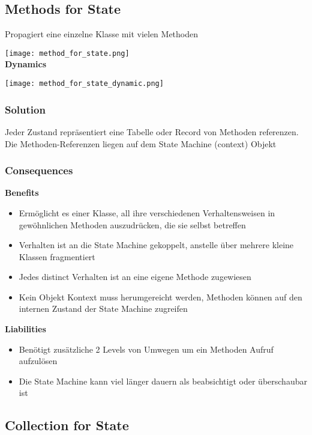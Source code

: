 \subsection{Methods for State}

Propagiert eine einzelne Klasse mit vielen Methoden

\texttt{[image: method\_for\_state.png]} \\

\textbf{Dynamics}

\texttt{[image: method\_for\_state\_dynamic.png]}

\subsubsection{Solution}

Jeder Zustand repräsentiert eine Tabelle oder Record von Methoden referenzen. Die Methoden-Referenzen liegen auf dem State Machine (context) Objekt

\subsubsection{Consequences}
\textbf{Benefits}
\begin{itemize}
    \item Ermöglicht es einer Klasse, all ihre verschiedenen Verhaltensweisen in gewöhnlichen Methoden auszudrücken, die sie selbst betreffen
    \item Verhalten ist an die State Machine gekoppelt, anstelle über mehrere kleine Klassen fragmentiert
    \item Jedes distinct Verhalten ist an eine eigene Methode zugewiesen
    \item Kein Objekt Kontext muss herumgereicht werden, Methoden können auf den internen Zustand der State Machine zugreifen
\end{itemize}
\vspace{10pt}
\textbf{Liabilities}
\begin{itemize}
    \item Benötigt zusätzliche 2 Levels von Umwegen um ein Methoden Aufruf aufzulösen
    \item Die State Machine kann viel länger dauern als beabsichtigt oder überschaubar ist
\end{itemize}

\subsection{Collection for State}

